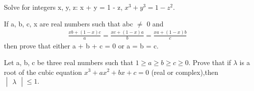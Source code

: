 \item Solve for integers x, y, z:
x + y = 1 - z, $x^{3} + y^{3} = 1 - z^{2}$.

\item If a, b, c, x are real numbers such that abc $\neq$ 0 and
\begin{align*}
\frac{xb+(1-x)c}{a} = \frac{xc+(1-x)a}{b} = \frac{xa+(1-x)b}{c}
\end{align*} 
then prove that either a + b + c = 0 or a = b = c.

\item Let a, b, c be three real numbers such that $1 \geq a \geq b \geq c \geq 0$. Prove that if $\lambda$ is a root of the cubic equation $x^{3} + ax^{2} + bx + c = 0$ (real or complex),then $\begin{vmatrix} \lambda \end{vmatrix} \leq 1.$


















